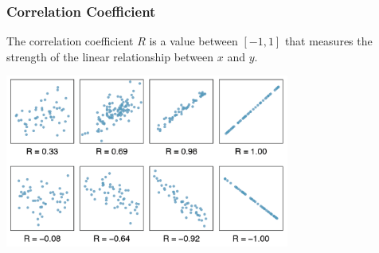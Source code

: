 \documentclass[handout]{beamer}
\begin{document}
\begin{frame}
\frametitle{Correlation Coefficient}

The correlation coefficient $R$ is a value between $[-1, 1]$ that measures the strength of the linear relationship between $x$ and $y$.  

\begin{center}
\pause\includegraphics[width=0.7\textwidth]{figure/correlation.png}
\end{center}

\end{frame}
\end{document}
